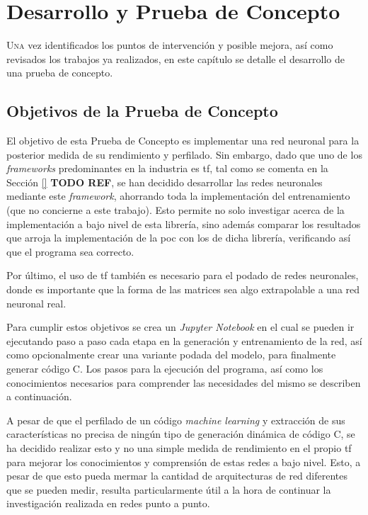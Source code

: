 \chapter{Desarrollo y Prueba de Concepto}
\label{chap:desarrollo_poc}

\lettrine{U}{na} vez identificados los puntos de intervención y posible mejora, así como revisados los trabajos ya realizados, en este capítulo se detalle el desarrollo de una prueba de concepto.


\section{Objetivos de la Prueba de Concepto}
\label{sec:objetivos_poc}
El objetivo de esta Prueba de Concepto es implementar una red neuronal para la posterior medida de su rendimiento y perfilado. Sin embargo, dado que uno de los \textit{frameworks} predominantes en la industria es \acrlong{tf}, tal como se comenta en la Sección \ref{} \textbf{TODO REF}, se han decidido desarrollar las redes neuronales mediante este \textit{framework}, ahorrando toda la implementación del entrenamiento (que no concierne a este trabajo). Esto permite no solo investigar acerca de la implementación a bajo nivel de esta librería, sino además comparar los resultados que arroja la implementación de la \acrshort{poc} con los de dicha librería, verificando así que el programa sea correcto.

Por último, el uso de \acrlong{tf} también es necesario para el podado de redes neuronales, donde es importante que la forma de las matrices sea algo extrapolable a una red neuronal real.

Para cumplir estos objetivos se crea un \textit{Jupyter Notebook} en el cual se pueden ir ejecutando paso a paso cada etapa en la generación y entrenamiento de la red, así como opcionalmente crear una variante podada del modelo, para finalmente generar código C. Los pasos para la ejecución del programa, así como los conocimientos necesarios para comprender las necesidades del mismo se describen a continuación.

A pesar de que el perfilado de un código \textit{machine learning} y extracción de sus características no precisa de ningún tipo de generación dinámica de código C, se ha decidido realizar esto y no una simple medida de rendimiento en el propio \acrlong{tf} para mejorar los conocimientos y comprensión de estas redes a bajo nivel. Esto, a pesar de que esto pueda mermar la cantidad de arquitecturas de red diferentes que se pueden medir, resulta particularmente útil a la hora de continuar la investigación realizada en redes punto a punto. 

